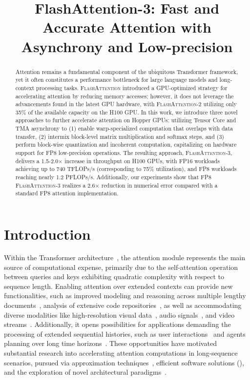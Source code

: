\title{FlashAttention-3: Fast and Accurate Attention with Asynchrony and Low-precision}

\begin{abstract}
Attention remains a fundamental component of the ubiquitous Transformer framework, yet it often constitutes a performance bottleneck for large language models and long-context processing tasks. \textsc{FlashAttention} introduced a GPU-optimized strategy for accelerating attention by reducing memory accesses; however, it does not leverage the advancements found in the latest GPU hardware, with \textsc{FlashAttention-2} utilizing only 35\% of the available capacity on the H100 GPU. In this work, we introduce three novel approaches to further accelerate attention on Hopper GPUs: utilizing Tensor Core and TMA asynchrony to (1) enable warp-specialized computation that overlaps with data transfer, (2) intermix block-level matrix multiplication and softmax steps, and (3) perform block-wise quantization and incoherent computation, capitalizing on hardware support for FP8 low-precision operations. The resulting approach, \textsc{FlashAttention-3}, delivers a 1.5-2.0$\times$ increase in throughput on H100 GPUs, with FP16 workloads achieving up to 740 TFLOPs/s (corresponding to 75\% utilization), and FP8 workloads reaching nearly 1.2 PFLOPs/s. Additionally, our experiments show that FP8 \textsc{FlashAttention-3} realizes a 2.6$\times$ reduction in numerical error compared with a standard FP8 attention implementation.
\end{abstract}

\section{Introduction}
\label{sec:intro}

Within the Transformer architecture~\citep{vaswani2017attention}, the attention module represents the main source of computational expense, primarily due to the self-attention operation between queries and keys exhibiting quadratic complexity with respect to sequence length. Enabling attention over extended contexts can provide new functionalities, such as improved modeling and reasoning across multiple lengthy documents~\citep{guo2021longt5,shaham2022scrolls,peng2023yarn}, analysis of extensive code repositories~\citep{roziere2023code, li2023starcoder}, as well as accommodating diverse modalities like high-resolution visual data~\citep{chen2022scaling}, audio signals~\citep{gulati2020conformer}, and video streams~\citep{ho2022video}. Additionally, it opens possibilities for applications demanding the processing of extended sequential histories, such as user interactions~\citep{sun2019bert4rec} and agents planning over long time horizons~\citep{yao2022react}. These opportunities have motivated substantial research into accelerating attention computations in long-sequence scenarios, pursued via approximation techniques~\citep{katharopoulos2020transformers,choromanski2020rethinking,
tay2020efficient}, efficient software solutions (\citep{rabe2021self,dao2022flashattention,kwon2023efficient}), and the exploration of novel architectural paradigms~\citep{peng2023rwkv,sun2023retentive,gu2023mamba}.

